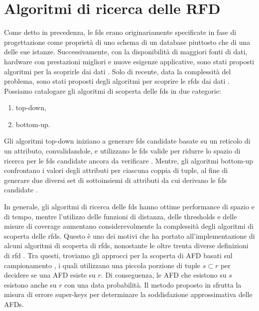 \section{Algoritmi di ricerca delle RFD}
Come detto in precedenza, le \acrfull{fds} erano originariamente specificate in fase di progettazione come propriet\`{a} di uno schema di un database piuttosto che di una delle sue istanze. Successivamente, con la disponibilit\`{a} di maggiori fonti di dati, hardware con prestazioni migliori e nuove esigenze applicative, sono stati proposti algoritmi per la scoprirle dai dati \cite{efficientdiscoveryfd}. Solo di recente, data la complessit\`{a} del problema, sono stati proposti degli algoritmi per scoprire le \acrfull{rfds} dai dati \cite{rfddiscovery,rfdsurvey,evominingrd,ddiscoveryfromdata,differentialdependencies}. Possiamo catalogare gli algoritmi di scoperta delle \acrfull{fds} in due categorie:
\begin{enumerate}
    \item top-down,
    \item bottom-up.
\end{enumerate}
Gli algoritmi top-down iniziano a generare \acrshort{fds} candidate basate su un reticolo di un attributo, convalidandole, e utilizzano le \acrshort{fds} valide per ridurre lo spazio di ricerca per le \acrshort{fds} candidate ancora da verificare \cite{tanealgfd,fdmine,fun,efficient-fd-discovery}. Mentre, gli algoritmi bottom-up confrontano i valori degli attributi per ciascuna coppia di tuple, al fine di generare due diversi set di sottoinsiemi di attributi da cui derivano le \acrshort{fds} candidate \cite{efficientdiscoveryarmstrong,fastfds,dbdependencydiscovery}.\par
In generale, gli algoritmi di ricerca delle \acrshort{fds} hanno ottime performance di spazio e di tempo, mentre l'utilizzo delle funzioni di distanza, delle thresholds e delle misure di coverage aumentano considerevolmente la complessit\`{a} degli algoritmi di scoperta delle \acrshort{rfds}. Questo \`{e} uno dei motivi che ha portato all'implementazione di alcuni algoritmi di scoperta di \acrshort{rfds}, nonostante le oltre trenta diverse definizioni di \acrshort{rfd} \cite{rfdsurvey,ddiscoveryfromdata}. Tra questi, troviamo gli approcci per la scoperta di AFD basati sul campionamento \cite{cords,approximateinferencefd}, i quali utilizzano una piccola porzione di tuple $s \subset r$ per decidere se una AFD esiste su $r$. Di conseguenza, le AFD che esistono su $s$ esistono anche su $r$ con una data probabilit\`{a}. Il metodo proposto in \cite{dioscoveryfdindatabase} sfrutta la misura di errore super-keys per determinare la soddisfazione approssimativa delle AFDs.\par
